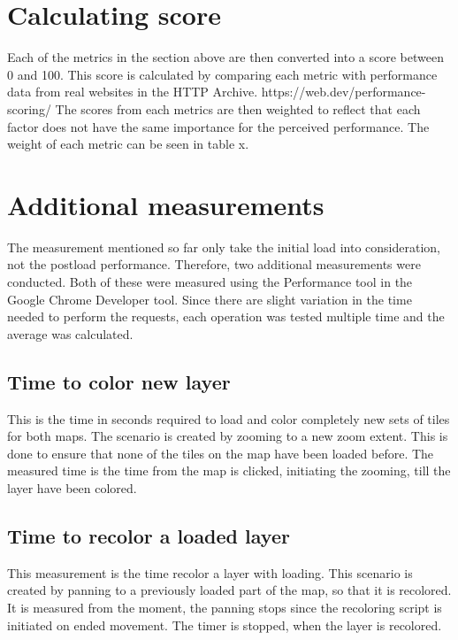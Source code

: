 \section{Calculating score}

Each of the metrics in the section above are then converted into a score between 0 and 100. This score is calculated by comparing each metric with performance data from real websites in the HTTP Archive.
https://web.dev/performance-scoring/
The scores from each metrics are then weighted to reflect that each factor does not have the same importance for the perceived performance. The weight of each metric can be seen in table x.


\section{Additional measurements}

The measurement mentioned so far only take the initial load into consideration, not the postload performance. 
Therefore, two additional measurements were conducted. Both of these were measured using the Performance tool in the Google Chrome Developer tool. Since there are slight variation in the time needed to perform the requests, each operation was tested multiple time and the average was calculated. 
\subsection{Time to color new layer}
This is the time in seconds required to load and color completely new sets of tiles for both maps. The scenario is created by zooming to a new zoom extent. This is done to ensure that none of the tiles on the map have been loaded before. The measured time is the time from the map is clicked, initiating the zooming, till the layer have been colored.

\subsection{Time to recolor a loaded layer}
This measurement is the time recolor a layer with loading. This scenario is created by panning to a previously loaded part of the map, so that it is recolored.
It is measured from the moment, the panning stops since the recoloring script is initiated on ended movement. The timer is stopped, when the layer is recolored.

